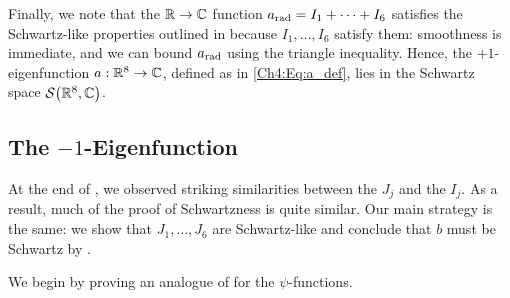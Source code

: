 
Finally, we note that the $\mathbb{R} \to \mathbb{C}$ function $a_{\operatorname{rad}} = I_1 + \cdots + I_6$ satisfies the Schwartz-like properties outlined in  because $I_1, \ldots, I_6$ satisfy them: smoothness is immediate, and we can bound $a_{\operatorname{rad}}$ using the triangle inequality. Hence, the $+1$-eigenfunction $a : \mathbb{R}^8 \to \mathbb{C}$, defined as in \eqref{Ch4:Eq:a_def}, lies in the Schwartz space $\mathcal{S}\!\left( \mathbb{R}^8, \mathbb{C} \right)$.



\subsection{The $-1$-Eigenfunction}
\label{Ch4:Subec:Schwartzness_b}

At the end of , we observed striking similarities between the $J_j$ and the $I_j$. As a result, much of the proof of Schwartzness is quite similar. Our main strategy is the same: we show that $J_1, \ldots, J_6$ are Schwartz-like and conclude that $b$ must be Schwartz by .

We begin by proving an analogue of  for the $\psi$-functions.

